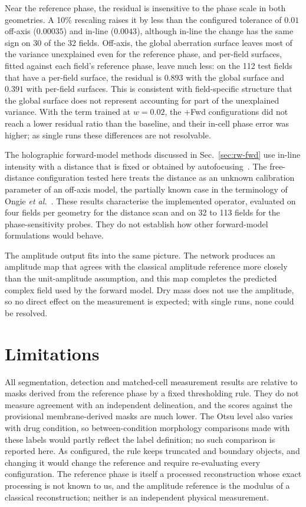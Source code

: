 \documentclass[11pt]{article}
\begin{document}
Near the reference phase, the residual is insensitive to the phase scale in both
geometries. A 10\% rescaling raises it by less than the configured tolerance of
$0.01$ off-axis ($0.00035$) and in-line ($0.0043$), although in-line the change
has the same sign on 30 of the 32 fields. Off-axis, the global aberration
surface leaves most of the variance unexplained even for the reference phase,
and per-field surfaces, fitted against each field's reference phase, leave much
less: on the 112 test fields that have a per-field surface, the residual is
$0.893$ with the global surface and $0.391$ with per-field surfaces. This is
consistent with
field-specific structure that the global surface does not represent accounting
for part of the unexplained variance. With the term trained at $w=0.02$, the
+Fwd configurations did not reach a lower residual ratio than the baseline, and
their in-cell phase error was higher; as single runs these differences are not
resolvable.

The holographic forward-model methods discussed in Sec.~\ref{sec:rw-fwd} use
in-line intensity with a distance that is fixed or obtained by
autofocusing~\cite{wang2020physennet,huang2023gedankennet,galande2024hdphysnet}.
The free-distance configuration tested here treats the distance as an unknown
calibration parameter of an off-axis model, the partially known case in the
terminology of Ongie \emph{et al.}~\cite{ongie2020deep}. These results
characterise the implemented operator, evaluated on four fields per geometry
for the distance scan and on 32 to 113 fields for the phase-sensitivity probes.
They do not establish how other forward-model formulations would behave.

The amplitude output fits into the same picture. The network produces an
amplitude map that agrees with the classical amplitude reference more closely
than the unit-amplitude assumption, and this map completes the predicted
complex field used by the forward model. Dry mass does not use the amplitude,
so no direct effect on the measurement is expected; with single runs, none
could be resolved.

\section{Limitations}
\label{sec:lim}

All segmentation, detection and matched-cell measurement results are relative
to masks derived from the reference phase by a fixed thresholding rule. They do
not measure agreement with an independent delineation, and the scores against
the provisional membrane-derived masks are much lower. The Otsu level also
varies with drug condition, so between-condition morphology comparisons made
with these labels would partly reflect the label definition; no such
comparison is reported here. As configured, the rule keeps truncated and
boundary objects, and changing it would change the reference and require
re-evaluating every configuration. The reference phase is itself a processed
reconstruction whose exact processing is not known to us, and the amplitude
reference is the modulus of a classical reconstruction; neither is an
independent physical measurement.
\end{document}
